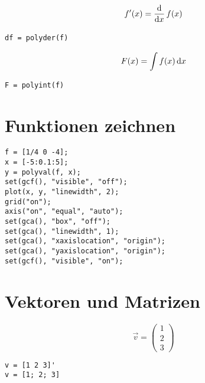 \documentclass
[
  fontsize = 11pt,
  parskip  = half-,
  BCOR     = 0pt,
  DIV      = 11,
  ngerman
]
{scrartcl}
\begin{document}
\begin{minipage}{\mw}
  \begin{equation*}
    \vphantom{\bigg(}%
    f'(x)=\frac{\mathrm{d}}{\mathrm{d}x}\,f(x)
  \end{equation*}
\end{minipage}%
\hfill
\begin{minipage}{\cw}
\begin{verbatim}
df = polyder(f)
\end{verbatim}
\end{minipage}

\begin{minipage}{\mw}
  \begin{equation*}
    \vphantom{\bigg(}%
    F(x)=\int f(x)\,\mathrm{d}x
  \end{equation*}
\end{minipage}%
\hfill
\begin{minipage}{\cw}
\begin{verbatim}
F = polyint(f)
\end{verbatim}
\end{minipage}

\section{Funktionen zeichnen}
\begin{verbatim}
f = [1/4 0 -4];
x = [-5:0.1:5];
y = polyval(f, x);
set(gcf(), "visible", "off");
plot(x, y, "linewidth", 2);
grid("on");
axis("on", "equal", "auto");
set(gca(), "box", "off");
set(gca(), "linewidth", 1);
set(gca(), "xaxislocation", "origin");
set(gca(), "yaxislocation", "origin");
set(gcf(), "visible", "on");
\end{verbatim}

\section{Vektoren und Matrizen}
\begin{minipage}{\mw}
  \begin{equation*}
    \vec{v}=\begin{pmatrix}
              1 \\ 2 \\ 3
            \end{pmatrix}
  \end{equation*}
\end{minipage}%
\hfill
\begin{minipage}{\cw}
\begin{verbatim}
v = [1 2 3]'
v = [1; 2; 3]
\end{verbatim}
\end{minipage}
\end{document}
